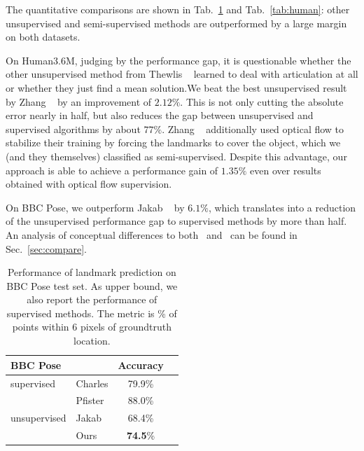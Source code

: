 			The quantitative comparisons are shown in Tab.~\ref{tab:bbcpose} and Tab.~\ref{tab:human}: other unsupervised and semi-supervised methods are outperformed by a large margin on both datasets.

			On Human3.6M, judging by the performance gap, it is questionable whether the other unsupervised method from Thewlis \etal~\cite{thewlis17} learned to deal with articulation at all or whether they just find a mean solution.We beat the best unsupervised result by Zhang \etal~\cite{zhang18} by an improvement of $2.12\%$. This is not only cutting the absolute error nearly in half, but also reduces the gap between unsupervised and supervised algorithms by about $77\%$.
			Zhang \etal~\cite{zhang18} additionally used optical flow to stabilize their training by forcing the landmarks to cover the object, which we (and they themselves) classified as semi-supervised.
			Despite this advantage, our approach is able to achieve a performance gain of $1.35\%$ even over results obtained with optical flow supervision.  %

			On BBC Pose, we outperform Jakab \etal~\cite{jakab18} by $6.1\%$, which translates into a reduction of the unsupervised performance gap to supervised methods by more than half. An analysis of conceptual differences to both~\cite{zhang18} and~\cite{jakab18} can be found in Sec.~\ref{sec:compare}.

			\begin{table}[htp]
				\caption{{
				Performance of landmark prediction on BBC Pose test set. As upper bound, we also report the performance of supervised methods.
				The metric is \% of points within 6 pixels of groundtruth location. %
				}}
				\label{tab:bbcpose}
				\centering
				\begin{tabular}{ll|cr}
				\hline
				BBC Pose &   &    { Accuracy}  \\
				 \hline
				supervised & Charles \cite{charles13bbcpose} &
				   79.9\%  \\ %
				 & Pfister \cite{pfister15flowingconv}  &
				  88.0\%  \\ \hline %
				unsupervised &Jakab \cite{jakab18} &
				 68.4\%  \\  %
				  &Ours &  \textbf{74.5}\% \\
				\hline
				\end{tabular}
			\end{table}

